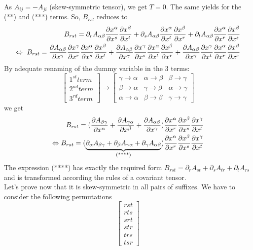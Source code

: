 As $A_{ij} = - A_{ji}$ (skew-symmetric tensor), we get $T=0$. The same yields for the (**) and (***) terms. So, $B_{rst}$ reduces to
\begin{align*}
\ B_{rst} = \partial_{r}{A_{\alpha\beta}}\pdv{x^{\alpha}}{x^{s}}\pdv{x^{\beta}}{x^{t}}+ 
\partial_{s}{A_{\alpha\beta}}\pdv{x^{\alpha}}{x^{t}}\pdv{x^{\beta}}{x^{r}}+
\partial_{t}{A_{\alpha\beta}}\pdv{x^{\alpha}}{x^{r}}\pdv{x^{\beta}}{x^{s}}\\
\Leftrightarrow \ B_{rst} = \pdv{A_{\alpha\beta}}{x^{\gamma}}\pdv{x^{\gamma}}{x^{r}}\pdv{x^{\alpha}}{x^{s}}\pdv{x^{\beta}}{x^{t}}+ 
\pdv{A_{\alpha\beta}}{x^{\gamma}}\pdv{x^{\gamma}}{x^{s}}\pdv{x^{\alpha}}{x^{t}}\pdv{x^{\beta}}{x^{r}}+
\pdv{A_{\alpha\beta}}{x^{\gamma}}\pdv{x^{\gamma}}{x^{t}}\pdv{x^{\alpha}}{x^{r}}\pdv{x^{\beta}}{x^{s}}
\end{align*}
By adequate renaming of the dummy variable in the 3 terms:
$$  \left[ {\begin{array}{c}
    1^{st} term \\
    2^{nd} term  \\
    3^{rd} term  
  \end{array} } \right]
\longrightarrow
  \left[ {\begin{array}{ccc}
    \gamma \to \alpha & \alpha \to \beta & \beta \to \gamma \\
    \beta \to \alpha & \gamma \to \beta & \alpha \to \gamma \\
    \alpha \to \alpha & \beta \to \beta & \gamma \to \gamma 
  \end{array} } \right]
$$
we get
\begin{align*}
\ B_{rst} = (\pdv{A_{\beta\gamma}}{x^{\alpha}}+\pdv{A_{\gamma\alpha}}{x^{\beta}}+\pdv{A_{\alpha\beta}}{x^{\gamma}})\pdv{x^{\alpha}}{x^{r}}\pdv{x^{\beta}}{x^{s}}\pdv{x^{\gamma}}{x^{t}}\\
\Leftrightarrow  B_{rst} = (\underbrace{\partial_{\alpha}{A_{\beta\gamma}}+\partial_{\beta}{A_{\gamma\alpha}}+\partial_{\gamma}{A_{\alpha\beta}}}_\text{(****)})\pdv{x^{\alpha}}{x^{r}}\pdv{x^{\beta}}{x^{s}}\pdv{x^{\gamma}}{x^{t}}
\end{align*}
The expression (****) has exactly the required form $B_{rst} = \partial_{r}{A_{st}} + \partial_{s}{A_{tr}} +\partial_{t}{A_{rs}} $ and is transformed according the rules of a covariant tensor.\\
Let's prove now that it is skew-symmetric in all pairs of suffixes.
We have to consider the following permutations
$$  \left[ {\begin{array}{c}
    rst \\
    rts\\
    srt  \\
    str\\  
    trs \\
    tsr
  \end{array} } \right]$$
  

